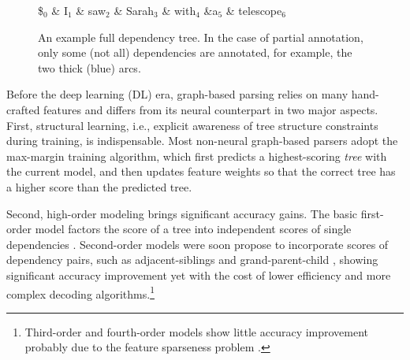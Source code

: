 \documentclass[11pt,a4paper]{article}
\begin{document}
\begin{figure}[tb]
\begin{center}
\begin{dependency}\begin{deptext}[column sep=.16cm] \$$_0$ \& I$_1$ \& saw$_2$ \& Sarah$_3$ \& with$_4$ \&a$_5$ \& telescope$_6$ \\
\end{deptext}
\end{dependency}
\caption{
    An example full dependency tree.
    In the case of partial annotation, only some (not all) dependencies are annotated,
    for example, the two thick (blue) arcs.
}
\label{fig:dep-tree-example} \end{center}
\end{figure} %
Before the deep learning (DL) era, graph-based parsing
relies on many hand-crafted features
and differs from its neural counterpart in two major aspects.
First, structural learning, i.e., explicit awareness of tree structure constraints during training,
is indispensable. Most non-neural graph-based parsers adopt the max-margin training algorithm, which
first predicts a highest-scoring \emph{tree} with the current model,
and then updates feature weights so that the correct tree
has a higher score than the predicted tree.

Second, high-order modeling brings significant accuracy gains. The basic first-order model factors the score of a tree into  independent scores of single dependencies \cite{mcdonald-etal-2005-online}.
Second-order models were soon propose to incorporate scores of dependency pairs,
such as adjacent-siblings
\cite{mcdonald-pereira-2006-online} and grand-parent-child \cite{carreras-2007-experiments,koo-collins-2010-efficient},
showing significant accuracy improvement yet with the cost of lower efficiency and more complex decoding algorithms.\footnote{Third-order and fourth-order models show little accuracy improvement probably due to the feature sparseness problem \cite{koo-collins-2010-efficient,ma-zhao-2012-fourth}.}
\end{document}
